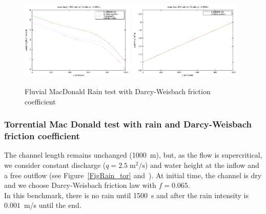 \documentclass[a4paper, 11pt]{article}
\begin{document}
\begin{figure}[htbp]
	\includegraphics[width=0.48\textwidth]{Figures_FullSWOF_2D/MacDo_rain_flu_DW_h}\ \includegraphics[width=0.48\textwidth]{Figures_FullSWOF_2D/MacDo_rain_flu_DW_q}
	\caption{Fluvial MacDonald Rain test with Darcy-Weisbach friction coefficient}
	\label{FigRain_flu}
\end{figure}

\subsubsection{Torrential Mac Donald test with rain and Darcy-Weisbach friction coefficient}
The channel length remains unchanged (1000~m), but, as the flow is supercritical, we consider constant discharge ($q=2.5\;\text{m}^2/\text{s}$) and water height at the inflow and a free outflow (see Figure~\ref{FigRain_tor} and~\citep[§~3.3.1]{Delestre13}).
At initial time, the channel is dry and we choose Darcy-Weisbach friction law with $f=0.065$.\\


In this benchmark, there is no rain until 1500~s and after the rain intensity is $0.001$~m/s until the end.
\end{document}
